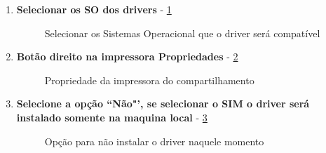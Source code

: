 \begin{enumerate}
	
	\item \textbf{Selecionar os SO dos drivers} - \ref{selecionar_so}
	\begin{figure}[ht]
	   	\centering
	   	\caption{Selecionar os Sistemas Operacional que o driver será compatível}
	    \label{selecionar_so}
	\end{figure}
	
	\pagebreak
	
	\item \textbf{Botão direito na impressora Propriedades} - \ref{propriedade_impressora}
	\begin{figure}[ht]
	   	\centering
	   	\caption{Propriedade da impressora do compartilhamento}
	    \label{propriedade_impressora}
	\end{figure}

	
	\item \textbf{Selecione a opção ``Não"', se selecionar o SIM o driver será instalado somente na maquina local} - \ref{opcao_nao}
	\begin{figure}[ht]
	   	\centering
	   	\caption{Opção para não instalar o driver naquele momento}
	    \label{opcao_nao}
	\end{figure}
	

\end{enumerate}
